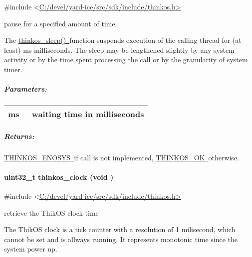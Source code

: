 {{}

{\#include
\textless{}}{\protect\hyperlink{h.pkwqa1}{C:/devel/yard-ice/src/sdk/include/thinkos.h}}{\protect\hyperlink{h.pkwqa1}{\textgreater{}}}

{pause for a specified amount of time }

{The
}{\protect\hyperlink{h.26in1rg}{thinkos\_sleep()}}{\protect\hyperlink{h.26in1rg}{~}}{function
suspends execution of the calling thread for (at least) ms milliseconds.
The sleep may be lengthened slightly by any system activity or by the
time spent processing the call or by the granularity of system timer.}

\subparagraph{\texorpdfstring{{Parameters:}}{Parameters:}}\label{parameters-7}

\protect\hypertarget{t.e4727bf18c12225c1cdcee7b27c6f0d762fa7610}{}{}\protect\hypertarget{t.7}{}{}

\begin{longtable}[]{@{}ll@{}}
\toprule
\begin{minipage}[t]{0.47\columnwidth}\raggedright\strut
{ms}{~}\strut
\end{minipage} & \begin{minipage}[t]{0.47\columnwidth}\raggedright\strut
{waiting time in milliseconds }\strut
\end{minipage}\tabularnewline
\bottomrule
\end{longtable}

\subparagraph{\texorpdfstring{{Returns:}}{Returns:}}\label{returns-8}

{\protect\hyperlink{h.3s49zyc}{THINKOS\_ENOSYS}}{\protect\hyperlink{h.3s49zyc}{~}}{if
call is not implemented,
}{\protect\hyperlink{h.2fk6b3p}{THINKOS\_OK}}{\protect\hyperlink{h.2fk6b3p}{~}}{otherwise.
}

\paragraph{\texorpdfstring{{uint32\_t thinkos\_clock (void
)}}{uint32\_t thinkos\_clock (void )}}\label{uint32_t-thinkos_clock-void}

{}

{\#include
\textless{}}{\protect\hyperlink{h.pkwqa1}{C:/devel/yard-ice/src/sdk/include/thinkos.h}}{\protect\hyperlink{h.pkwqa1}{\textgreater{}}}

{retrieve the ThikOS clock time }

{The ThikOS clock is a tick counter with a resolution of 1 milisecond,
which cannot be set and is allways running. It represents monotonic time
since the system power up.}

}
